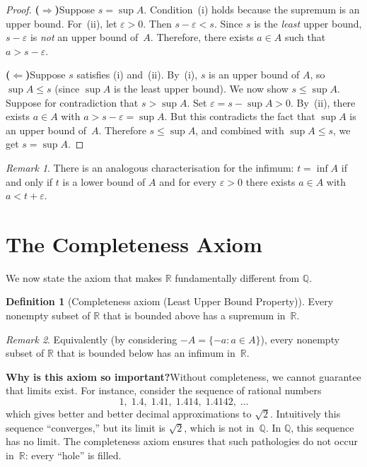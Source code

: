 \documentclass[12pt,a4paper,openany]{book}
\newcommand{\Q}{\mathbb{Q}}
\newcommand{\R}{\mathbb{R}}
\newcommand{\eps}{\varepsilon}
\theoremstyle{definition}
\newtheorem{definition}{Definition}[chapter]
\theoremstyle{remark}
\newtheorem{remark}{Remark}[chapter]
\begin{document}
\begin{proof}
\textbf{($\Rightarrow$)}\quad Suppose $s = \sup A$.  Condition~(i) holds
because the supremum is an upper bound.  For~(ii), let $\eps > 0$.  Then
$s - \eps < s$.  Since $s$ is the \emph{least} upper bound, $s-\eps$ is
\emph{not} an upper bound of~$A$.  Therefore, there exists $a \in A$ such
that $a > s - \eps$.

\textbf{($\Leftarrow$)}\quad Suppose $s$ satisfies (i) and~(ii).
By~(i), $s$ is an upper bound of $A$, so $\sup A \leq s$ (since $\sup A$
is the least upper bound).  We now show $s \leq \sup A$.  Suppose for
contradiction that $s > \sup A$.  Set $\eps = s - \sup A > 0$.  By~(ii),
there exists $a \in A$ with $a > s - \eps = \sup A$.  But this contradicts
the fact that $\sup A$ is an upper bound of~$A$.  Therefore $s \leq \sup A$,
and combined with $\sup A \leq s$, we get $s = \sup A$.
\end{proof}

\begin{remark}
There is an analogous characterisation for the infimum: $t = \inf A$ if and
only if $t$ is a lower bound of $A$ and for every $\eps > 0$ there exists
$a \in A$ with $a < t + \eps$.
\end{remark}

\section{The Completeness Axiom}
\label{sec:completeness}

We now state the axiom that makes $\R$ fundamentally different from $\Q$.

\begin{definition}[Completeness axiom (Least Upper Bound Property)]\label{def:completeness}
Every nonempty subset of $\R$ that is bounded above has a supremum in~$\R$.
\end{definition}

\begin{remark}
Equivalently (by considering $-A = \{-a : a \in A\}$), every nonempty
subset of $\R$ that is bounded below has an infimum in~$\R$.
\end{remark}

\medskip

\textbf{Why is this axiom so important?}\quad Without completeness, we
cannot guarantee that limits exist.  For instance, consider the sequence of
rational numbers
\[
  1,\; 1.4,\; 1.41,\; 1.414,\; 1.4142,\; \dots
\]
which gives better and better decimal approximations to $\sqrt{2}$.
Intuitively this sequence ``converges,'' but its limit is $\sqrt{2}$, which
is not in~$\Q$.  In $\Q$, this sequence has no limit.  The completeness
axiom ensures that such pathologies do not occur in~$\R$: every ``hole'' is
filled.
\end{document}
